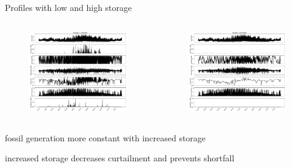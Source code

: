 \documentclass[aspectratio=169,11pt]{beamer}
\begin{document}
\begin{frame}{Profiles with low and high storage}
\begin{columns}
    \begin{column}{0.5\textwidth}
        \begin{figure}
            \centering
            \includegraphics[width=\columnwidth]{./figures/p4.pdf}
        \end{figure}
    \end{column}
    \begin{column}{0.5\textwidth}
        \begin{figure}
            \centering
            \includegraphics[width=\columnwidth]{./figures/p5.pdf}
        \end{figure}
    \end{column}
\end{columns}
\vfill
\BIT 
\item fossil generation more constant with increased storage
\item increased storage decreases curtailment and prevents shortfall
\EIT
\end{frame}
\end{document}
